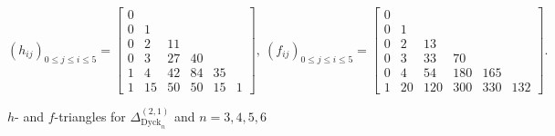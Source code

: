 \documentclass[11pt]{amsart}
\def\Dyck{\mathrm{Dyck}}
\theoremstyle{plain}
\numberwithin{lemma}{\DefaultNumberTheoremWithin}
\numberwithin{theorem}{\DefaultNumberTheoremWithin}
\numberwithin{corollary}{\DefaultNumberTheoremWithin}
\numberwithin{proposition}{\DefaultNumberTheoremWithin}
\numberwithin{conjecture}{\DefaultNumberTheoremWithin}
\theoremstyle{definition}
\numberwithin{definition}{\DefaultNumberTheoremWithin}
\numberwithin{question}{\DefaultNumberTheoremWithin}
\numberwithin{problem}{\DefaultNumberTheoremWithin}
\theoremstyle{remark}
\numberwithin{remark}{\DefaultNumberTheoremWithin}
\numberwithin{example}{\DefaultNumberTheoremWithin}
\numberwithin{claim}{\DefaultNumberTheoremWithin}
\begin{document}
\begin{figure}[H]
{$$ (h_{ij})_{0 \leq j \leq i \leq 5} = \left[\begin{array}{cccccc}
 0 &    &   &     & & \\
  0 & 1  &  &     & &\\
  0& 2  & 11 &    & & \\
  0 & 3 & 27 & 40 & & \\
  1 & 4 & 42 & 84 & 35 & \\
  1 & 15 & 50 & 50 & 15 & 1 
  \end{array}\right],\
(f_{ij})_{0 \leq j \leq i \leq 5} = \left[
 \begin{array}{ccccccc}
  0 &    &   &  & & \\
  0 & 1  &   &  & & \\
  0 & 2  & 13 & & & \\
  0& 3 & 33 & 70 &  & \\
  0 & 4 & 54 & 180 & 165 & \\
  1 & 20 & 120 & 300 & 330 & 132 
  \end{array}\right].$$}

      \caption{$h$- and $f$-triangles for $\Delta^{(2,1)}_{\Dyck_n}$ and $n=3,4,5,6$}
      \label{fig:fc2}
  \end{figure}
\end{document}
